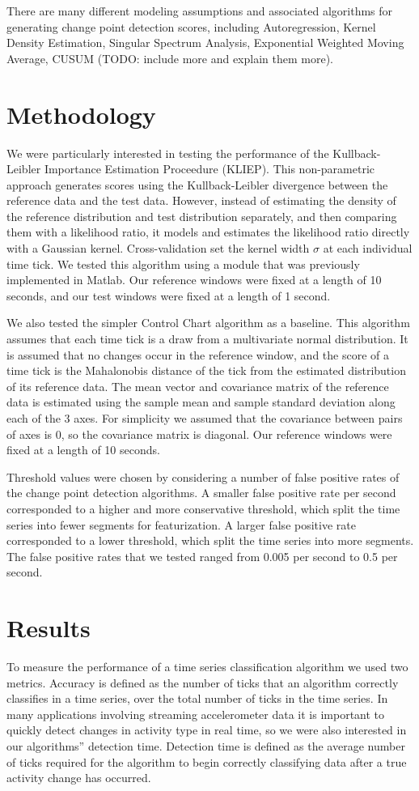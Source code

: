 \documentclass[onehalf,11pt]{beavtex}
\begin{document}
There are many different modeling assumptions and associated algorithms
for generating change point detection scores,
including Autoregression, Kernel Density Estimation, Singular Spectrum
Analysis, Exponential Weighted Moving Average, CUSUM
(TODO: include more and explain them more).

\section{Methodology}
We were particularly interested in testing the performance of the
Kullback-Leibler Importance Estimation Proceedure (KLIEP).
This non-parametric approach generates scores using the Kullback-Leibler
divergence between the reference data and the test data. However, instead of
estimating the density of the reference distribution and test distribution
separately, and then comparing them with a likelihood ratio, it models and
estimates the likelihood ratio directly with a Gaussian kernel. Cross-validation 
set the kernel width $\sigma$ at each individual time tick.
We tested this algorithm using a module that was previously implemented in Matlab.
Our reference windows were fixed at a length of 10 seconds, and our test
windows were fixed at a length of 1 second.

We also tested the simpler Control Chart algorithm as a baseline. This
algorithm assumes that each time tick is a draw from a multivariate normal distribution.
It is assumed that no changes occur in the reference window, and the score of a time
tick is the Mahalonobis distance of the tick from the estimated distribution of its reference data.
The mean vector and covariance matrix of the reference data is estimated using
the sample mean and sample standard deviation along each of the 3 axes. For simplicity
we assumed that the covariance between pairs of axes is 0, so the covariance matrix is
diagonal. Our reference windows were fixed at a length of 10 seconds. 

Threshold values were chosen by considering a number of false positive rates of
the change point detection algorithms. A smaller false positive rate per second
corresponded to a higher and more conservative threshold, which split the
time series into fewer segments for featurization. A larger false positive rate
corresponded to a lower threshold, which split the time series into more segments.
The false positive rates that we tested ranged from 0.005 per second to 0.5 per second.

\section{Results}
To measure the performance of a time series classification algorithm we used
two metrics. Accuracy is defined as the number of
ticks that an algorithm correctly classifies in a time series, over the total number of ticks
in the time series. In many applications involving streaming accelerometer data
it is important to quickly detect changes in activity type in real time, so we
were also interested in our algorithms'' detection time.
Detection time is defined as the average number of ticks
required for the algorithm to begin correctly classifying data after a
true activity change has occurred.
\end{document}
